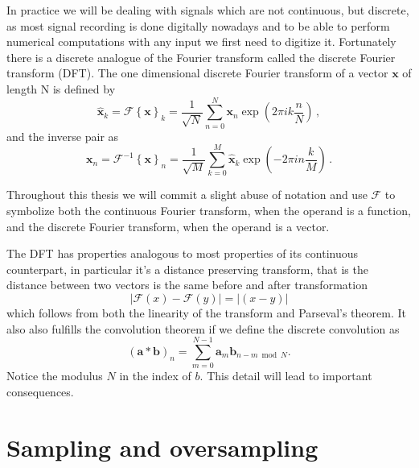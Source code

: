 In practice we will be dealing with signals which are not continuous, but
discrete, as most signal recording is done digitally nowadays and to be able to
perform numerical computations with any input we first need to digitize
it. Fortunately there is a discrete analogue of the Fourier transform called
the discrete Fourier transform (DFT). The one dimensional discrete Fourier
transform of a vector $\mathbf x$ of length N is defined by
\begin{equation}
\hat{\mathbf x}_k = \mathscr{F}\left\{ \mathbf x\right\}_k = \frac{1}{\sqrt{N}} \sum
\limits_{n=0}^{N} \mathbf x_n \exp\left(2 \pi i k \frac{n}{N}\right) \, ,
\end{equation}
and the inverse pair as
\begin{equation}
{\mathbf x}_n = \mathscr{F}^{-1}\left\{ \mathbf x\right\}_n = \frac{1}{\sqrt{M}} \sum
\limits_{k=0}^{M} \hat{\mathbf x}_k \exp\left(-2 \pi i n \frac{k}{M}\right) \, .
\end{equation}

Throughout this thesis we will commit a slight abuse of notation and use
$\mathscr{F}$ to symbolize both the continuous Fourier transform, when the
operand is a function, and the discrete Fourier transform, when the operand is a
vector.
 
The DFT has properties analogous to most properties of its continuous
counterpart, in particular it's a distance preserving transform, that is the distance between two vectors is the same before and after transformation
\begin{equation}
  |\mathscr{F}(x)-\mathscr{F}(y)| = |(x-y)|
\end{equation}
which follows from both the linearity of the transform and Parseval's theorem.
It also also fulfills the convolution theorem if we define the discrete
convolution as
\begin{equation}
  (\mathbf a * \mathbf b)_n = \sum \limits_{m = 0}^{N-1} \mathbf a_m 
  \mathbf  b_{n-m \bmod N} .
\end{equation}
Notice the modulus $N$ in the index of $b$. This detail will lead to important
consequences.

\section{Sampling and oversampling}


